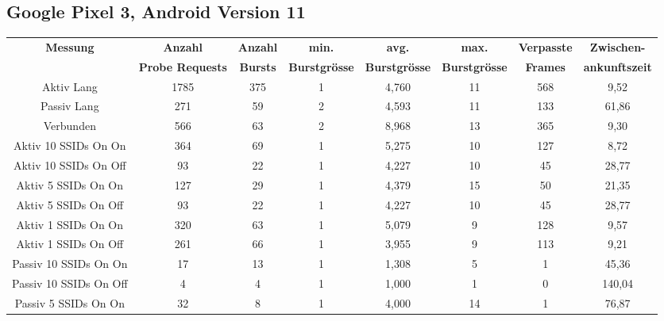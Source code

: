 \begin{landscape}
   \subsection*{Google Pixel 3, Android Version 11}
   \begin{table}[h!]
      \small
      \centering
      \begin{tabular}{|c|c|c|c|c|c|c|c|}
      \hline
      \textbf{Messung} & \textbf{Anzahl} & \textbf{Anzahl} & \textbf{min.} & \textbf{avg.} & \textbf{max.} & \textbf{Verpasste} & \textbf{Zwischen-}\\
      & \textbf{Probe Requests} & \textbf{Bursts} & \textbf{Burstgrösse} & \textbf{Burstgrösse} & \textbf{Burstgrösse} & \textbf{Frames} & \textbf{ankunftszeit}\\
      \hline
      Aktiv Lang & 1785 & 375 & 1 & 4,760 & 11 & \phantom{0}568 & \phantom{00}9,52 \\
      Passiv Lang  & \phantom{0}271 & \phantom{0}59 & 2 & 4,593 & 11 & \phantom{0}133 & \phantom{0}61,86 \\
      Verbunden & \phantom{0}566 & \phantom{0}63 & 2 & 8,968 & 13 & \phantom{0}365 & \phantom{00}9,30 \\
      Aktiv 10 SSIDs On On & \phantom{0}364 & \phantom{0}69 & 1 & 5,275 & 10 & \phantom{0}127 & \phantom{00}8,72 \\
      Aktiv 10 SSIDs On Off & \phantom{00}93 & \phantom{0}22 & 1 & 4,227 & 10 & \phantom{00}45 & \phantom{0}28,77 \\
      Aktiv 5 SSIDs On On & \phantom{0}127 & \phantom{0}29 & 1 & 4,379 & 15 & \phantom{00}50 & \phantom{0}21,35 \\
      Aktiv 5 SSIDs On Off & \phantom{00}93 & \phantom{0}22 & 1 & 4,227 & 10 & \phantom{00}45 & \phantom{0}28,77 \\
      Aktiv 1 SSIDs On On & \phantom{0}320 & \phantom{0}63 & 1 & 5,079 & \phantom{0}9 & \phantom{0}128 & \phantom{00}9,57 \\
      Aktiv 1 SSIDs On Off & \phantom{0}261 & \phantom{0}66 & 1 & 3,955 & \phantom{0}9 & \phantom{0}113 & \phantom{00}9,21 \\
      Passiv 10 SSIDs On On & \phantom{00}17 & \phantom{0}13 & 1 & 1,308 & \phantom{0}5 & \phantom{000}1 & \phantom{0}45,36 \\
      Passiv 10 SSIDs On Off & \phantom{000}4 & \phantom{00}4 & 1 & 1,000 & \phantom{0}1 & \phantom{000}0 & 140,04 \\
      Passiv 5 SSIDs On On & \phantom{00}32 & \phantom{00}8 & 1 & 4,000 & 14 & \phantom{000}1 & \phantom{0}76,87 \\

\end{tabular}
\end{table}
\end{landscape}
